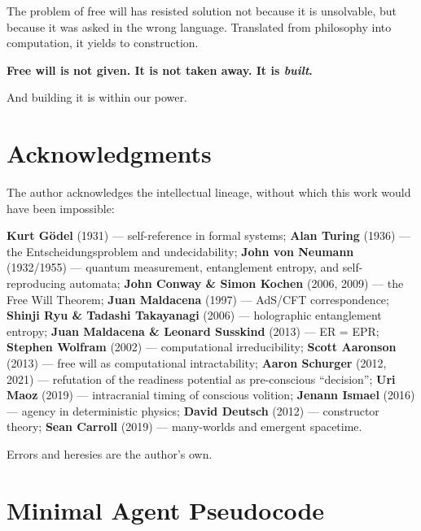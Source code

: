 \documentclass[12pt,a4paper]{article}
\theoremstyle{definition}
\theoremstyle{remark}
\begin{document}
The problem of free will has resisted solution not because it is unsolvable,
but because it was asked in the wrong language. Translated from philosophy
into computation, it yields to construction.

\textbf{Free will is not given. It is not taken away. It is \emph{built}.}

And building it is within our power.


\section*{Acknowledgments}

The author acknowledges the intellectual lineage, without which this work
would have been impossible:

\textbf{Kurt G\"odel} (1931) --- self-reference in formal systems;
\textbf{Alan Turing} (1936) --- the Entscheidungsproblem and undecidability;
\textbf{John von Neumann} (1932/1955) --- quantum measurement, entanglement
entropy, and self-reproducing automata;
\textbf{John Conway \& Simon Kochen} (2006, 2009) --- the Free Will Theorem;
\textbf{Juan Maldacena} (1997) --- AdS/CFT correspondence;
\textbf{Shinji Ryu \& Tadashi Takayanagi} (2006) --- holographic entanglement
entropy;
\textbf{Juan Maldacena \& Leonard Susskind} (2013) --- ER = EPR;
\textbf{Stephen Wolfram} (2002) --- computational irreducibility;
\textbf{Scott Aaronson} (2013) --- free will as computational intractability;
\textbf{Aaron Schurger} (2012, 2021) --- refutation of the readiness
potential as pre-conscious ``decision'';
\textbf{Uri Maoz} (2019) --- intracranial timing of conscious volition;
\textbf{Jenann Ismael} (2016) --- agency in deterministic physics;
\textbf{David Deutsch} (2012) --- constructor theory;
\textbf{Sean Carroll} (2019) --- many-worlds and emergent spacetime.

Errors and heresies are the author's own.


\appendix

\section{Minimal Agent Pseudocode}
\label{app:pseudocode}
\end{document}

